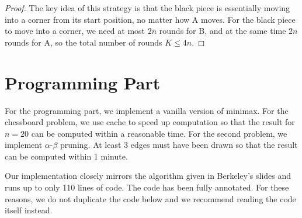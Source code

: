 \documentclass[a4paper]{article}
\theoremstyle{definition}
\begin{document}
\begin{proof}
    The key idea of this strategy is that the black piece is essentially moving
    into a corner from its start position, no matter how A moves. For the black
    piece to move into a corner, we need at most $2n$ rounds for B, and at the
    same time $2n$ rounds for A, so the total number of rounds $K \leq 4n$.
\end{proof}

\section*{Programming Part}

For the programming part, we implement a vanilla version of minimax. For the
chessboard problem, we use cache to speed up computation so that the result for
$n = 20$ can be computed within a reasonable time. For the second problem, we
implement $\alpha$-$\beta$ pruning. At least 3 edges must have been drawn so
that the result can be computed within 1 minute.

Our implementation closely mirrors the algorithm given in Berkeley's slides and
runs up to only 110 lines of code. The code has been fully annotated. For these
reasons, we do not duplicate the code below and we recommend reading the code
itself instead.
\end{document}
